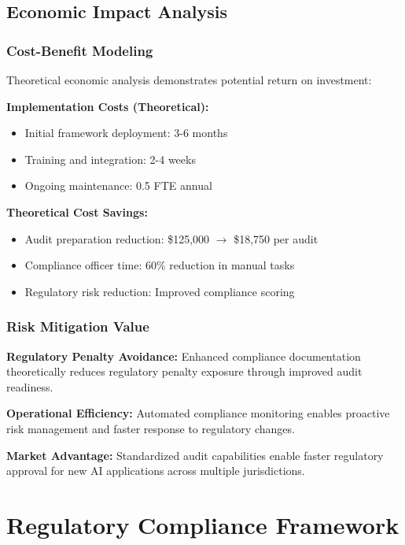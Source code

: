 \documentclass[12pt,a4paper]{article}
\begin{document}
\subsection{Economic Impact Analysis}

\subsubsection{Cost-Benefit Modeling}

Theoretical economic analysis demonstrates potential return on investment:

\textbf{Implementation Costs (Theoretical):}
\begin{itemize}
\item Initial framework deployment: 3-6 months
\item Training and integration: 2-4 weeks
\item Ongoing maintenance: 0.5 FTE annual
\end{itemize}

\textbf{Theoretical Cost Savings:}
\begin{itemize}
\item Audit preparation reduction: \$125,000 $\rightarrow$ \$18,750 per audit
\item Compliance officer time: 60\% reduction in manual tasks
\item Regulatory risk reduction: Improved compliance scoring
\end{itemize}

\subsubsection{Risk Mitigation Value}

\textbf{Regulatory Penalty Avoidance:} Enhanced compliance documentation theoretically reduces regulatory penalty exposure through improved audit readiness.

\textbf{Operational Efficiency:} Automated compliance monitoring enables proactive risk management and faster response to regulatory changes.

\textbf{Market Advantage:} Standardized audit capabilities enable faster regulatory approval for new AI applications across multiple jurisdictions.

\section{Regulatory Compliance Framework}
\end{document}

